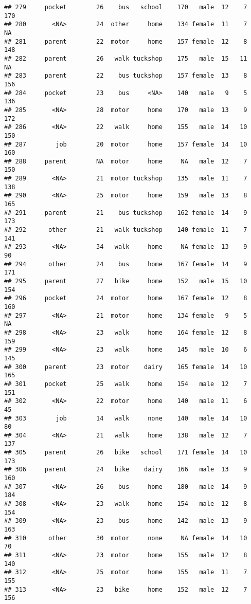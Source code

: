 \documentclass[
]{article}
\begin{document}
\begin{verbatim}
## 279     pocket        26    bus   school    170   male  12    7     170
## 280       <NA>        24  other     home    134 female  11    7      NA
## 281     parent        22  motor     home    157 female  12    8     148
## 282     parent        26   walk tuckshop    175   male  15   11      NA
## 283     parent        22    bus tuckshop    157 female  13    8     156
## 284     pocket        23    bus     <NA>    140   male   9    5     136
## 285       <NA>        28  motor     home    170   male  13    9     172
## 286       <NA>        22   walk     home    155   male  14   10     150
## 287        job        20  motor     home    157 female  14   10     160
## 288     parent        NA  motor     home     NA   male  12    7     150
## 289       <NA>        21  motor tuckshop    135   male  11    7     138
## 290       <NA>        25  motor     home    159   male  13    8     165
## 291     parent        21    bus tuckshop    162 female  14    9     173
## 292      other        21   walk tuckshop    140 female  11    7     141
## 293       <NA>        34   walk     home     NA female  13    9      90
## 294      other        24    bus     home    167 female  14    9     171
## 295     parent        27   bike     home    152   male  15   10     154
## 296     pocket        24  motor     home    167 female  12    8     160
## 297       <NA>        21  motor     home    134 female   9    5      NA
## 298       <NA>        23   walk     home    164 female  12    8     159
## 299       <NA>        23   walk     home    145   male  10    6     145
## 300     parent        23  motor    dairy    165 female  14   10     165
## 301     pocket        25   walk     home    154   male  12    7     151
## 302       <NA>        22  motor     home    140   male  11    6      45
## 303        job        14   walk     none    140   male  14   10      80
## 304       <NA>        21   walk     home    138   male  12    7     137
## 305     parent        26   bike   school    171 female  14   10     173
## 306     parent        24   bike    dairy    166   male  13    9     160
## 307       <NA>        26    bus     home    180   male  14    9     184
## 308       <NA>        23   walk     home    154   male  12    8     154
## 309       <NA>        23    bus     home    142   male  13    9     163
## 310      other        30  motor     none     NA female  14   10      70
## 311       <NA>        23  motor     home    155   male  12    8     140
## 312       <NA>        25  motor     home    155   male  11    7     155
## 313       <NA>        23   bike     home    152   male  12    7     156

\end{verbatim}
\end{document}

